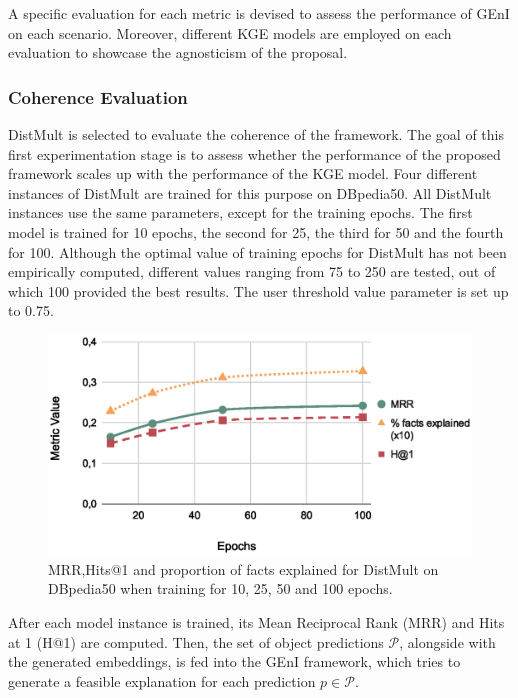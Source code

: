 A specific evaluation for each metric is devised to assess the performance of GEnI on each scenario. Moreover, different KGE models are employed on each evaluation to showcase the agnosticism of the proposal.

\subsubsection{Coherence Evaluation}
DistMult is selected to evaluate the coherence of the framework. The goal of this first experimentation stage is to assess whether the performance of the proposed framework scales up with the performance of the KGE model. Four different instances of DistMult are trained for this purpose on DBpedia50. All DistMult instances use the same parameters, except for the training epochs. The first model is trained for 10 epochs, the second for 25, the third for 50 and the fourth for 100. Although the optimal value of training epochs for DistMult has not been empirically computed, different values ranging from 75 to 250 are tested, out of which 100 provided the best results. The user threshold value parameter is set up to 0.75. 

\begin{figure}[t]
    \centering
    \includegraphics[width=.9\linewidth]{6_kbsextractiondl/figures/coherence_geni_epochs.eps}
    \caption{MRR,Hits@1 and proportion of facts explained for DistMult on DBpedia50 when training for 10, 25, 50 and 100 epochs.}
    \label{fig:coherence_geni_epochs}
\end{figure}

After each model instance is trained, its Mean Reciprocal Rank (MRR) and Hits at 1 (H@1) are computed. Then, the set of object predictions $\mathcal{P}$, alongside with the generated embeddings, is fed into the GEnI framework, which tries to generate a feasible explanation for each prediction $p \in \mathcal{P}$.

